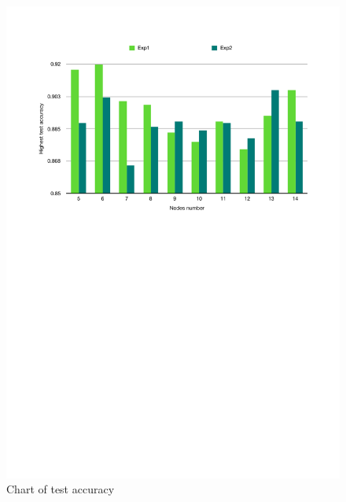 \begin{figure}[h]
    \centering
    \includegraphics[width=\textwidth]{img/expdchart.pdf}
    \caption{Chart of test accuracy}
    \label{fig:expdchart}
\end{figure}




